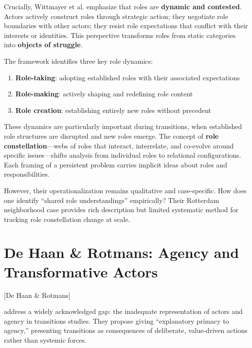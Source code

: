 \documentclass[../main.tex]{subfiles}
\begin{document}
Crucially, Wittmayer et al. emphasize that roles are \textbf{dynamic and contested}. Actors actively construct roles through strategic action; they negotiate role boundaries with other actors; they resist role expectations that conflict with their interests or identities. This perspective transforms roles from static categories into \textbf{objects of struggle}.

The framework identifies three key role dynamics:

\begin{enumerate}[nosep]
\item \textbf{Role-taking}: adopting established roles with their associated expectations
\item \textbf{Role-making}: actively shaping and redefining role content
\item \textbf{Role creation}: establishing entirely new roles without precedent
\end{enumerate}

These dynamics are particularly important during transitions, when established role structures are disrupted and new roles emerge. The concept of \textbf{role constellation}---webs of roles that interact, interrelate, and co-evolve around specific issues---shifts analysis from individual roles to relational configurations. Each framing of a persistent problem carries implicit ideas about roles and responsibilities.

However, their operationalization remains qualitative and case-specific. How does one identify ``shared role understandings'' empirically? Their Rotterdam neighborhood case provides rich description but limited systematic method for tracking role constellation change at scale.


\section{De Haan \& Rotmans: Agency and Transformative Actors}[De Haan \& Rotmans]

\textcite{dehaan2018power} address a widely acknowledged gap: the inadequate representation of actors and agency in transitions studies. They propose giving ``explanatory primacy to agency,'' presenting transitions as consequences of deliberate, value-driven actions rather than systemic forces.
\end{document}
